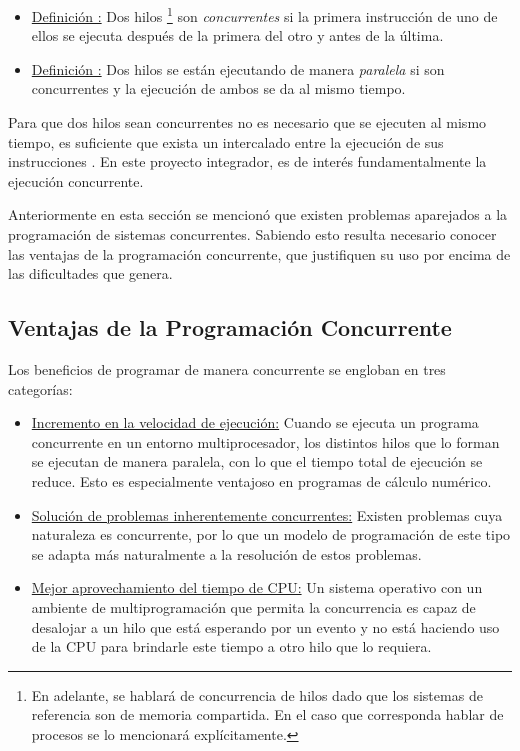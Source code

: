 \begin{itemize}
	\item \underline{Definición \thedefinitionsCounter :}  Dos hilos
	\footnote{En adelante, se hablará de concurrencia de hilos dado que los
	sistemas de referencia son de memoria compartida. En el caso que corresponda
	hablar de procesos se lo mencionará explícitamente.} son \textit{concurrentes}
	si la primera instrucción de uno de ellos se ejecuta después de la primera del
	otro y antes de la última.
	\item \underline{Definición \thedefinitionsCounter :}  Dos hilos 	se están
	ejecutando de manera \textit{paralela} si son concurrentes y la ejecución de
	ambos se da al mismo tiempo.
\end{itemize}

Para que dos hilos sean concurrentes no es necesario que se ejecuten al mismo
tiempo, es suficiente que exista un intercalado entre la ejecución de sus
instrucciones \cite{PalmaConcurrente}. En este proyecto integrador, es de
interés fundamentalmente la ejecución concurrente.

Anteriormente en esta sección se mencionó que existen problemas aparejados a la
programación de sistemas concurrentes. Sabiendo esto resulta necesario conocer
las ventajas de la programación concurrente, que justifiquen su uso por encima de
las dificultades que genera.

\subsection{Ventajas de la Programación Concurrente}

Los beneficios de programar de manera concurrente se engloban en tres
categorías:

\begin{itemize}
	\item \underline{Incremento en la velocidad de ejecución:} Cuando se ejecuta un
	programa concurrente en un entorno multiprocesador, los distintos hilos que
	lo forman se ejecutan de manera paralela, con lo que el tiempo total de
	ejecución se reduce. Esto es especialmente ventajoso en programas de cálculo
	numérico.
	\item \underline{Solución de problemas inherentemente concurrentes:} Existen
	problemas cuya naturaleza es concurrente, por lo que un modelo de programación
	de este tipo se adapta más naturalmente a la resolución de estos problemas.
	\item \underline{Mejor aprovechamiento del tiempo de CPU:} Un sistema operativo
	con un ambiente de multiprogramación que permita la concurrencia es capaz de
	desalojar a un hilo que está esperando por un evento y no está haciendo uso
	de la CPU para brindarle este tiempo a otro hilo que lo requiera.
\end{itemize}


